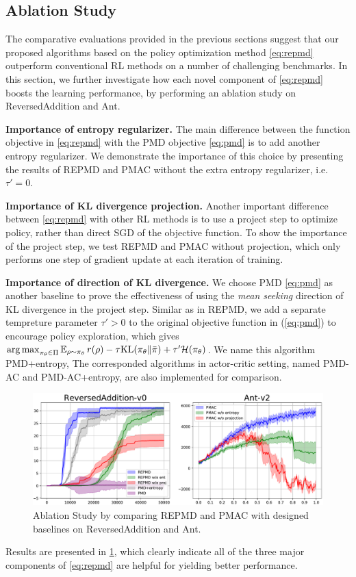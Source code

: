 \subsection{Ablation Study}
\label{subsec:ablationstudy}

The comparative evaluations provided in the previous sections suggest that our proposed algorithms based on the policy optimization method \ref{eq:repmd} outperform conventional RL methods on a number of challenging benchmarks. In this section, we further investigate how each novel component of \cref{eq:repmd} boosts the learning performance, by performing an ablation study on ReversedAddition and Ant.


\textbf{Importance of entropy regularizer.} The main difference between the function objective in \cref{eq:repmd} with the PMD objective \cref{eq:pmd} is to add another entropy regularizer. We demonstrate the importance of this choice by presenting the results of REPMD and PMAC without the extra entropy regularizer, i.e. $\tau'=0$.

\textbf{Importance of KL divergence projection.} Another important difference between \cref{eq:repmd} with other RL methods is to use a project step to optimize policy, rather than direct SGD of the objective function. To show the importance of the project step, we test REPMD and PMAC without projection, which only performs one step of gradient update at each iteration of training. 

\textbf{Importance of direction of KL divergence.} We choose PMD \ref{eq:pmd} as another baseline to prove the effectiveness of using the \emph{mean seeking} direction of KL divergence in the project step. Similar as in REPMD, we add a separate tempreture parameter $\tau' > 0$ to the original objective function in (\ref{eq:pmd}) to encourage policy exploration, which gives $\operatorname*{arg\,max}_{\pi_\theta \in \Pi}{ \operatorname*{\mathbb{E}}_{\rho \sim \pi_\theta}{  r(\rho)  - \tau \text{KL}(\pi_\theta \| \bar{\pi}) } + \tau'\mathcal{H}(\pi_\theta) }$. We name this algorithm PMD+entropy, The corresponded algorithms in actor-critic setting, named PMD-AC and PMD-AC+entropy, are also implemented for comparison.

\begin{figure}[t]
\begin{center}
\includegraphics[width=0.5\linewidth]{./ablation-results.pdf}
\end{center}
\caption{Ablation Study by comparing REPMD and PMAC with designed baselines on ReversedAddition and Ant. }
\label{fig:ablation}
\end{figure}

Results are presented in \cref{fig:ablation}, which clearly indicate all of the three major components of \cref{eq:repmd} are helpful for yielding better performance. 

